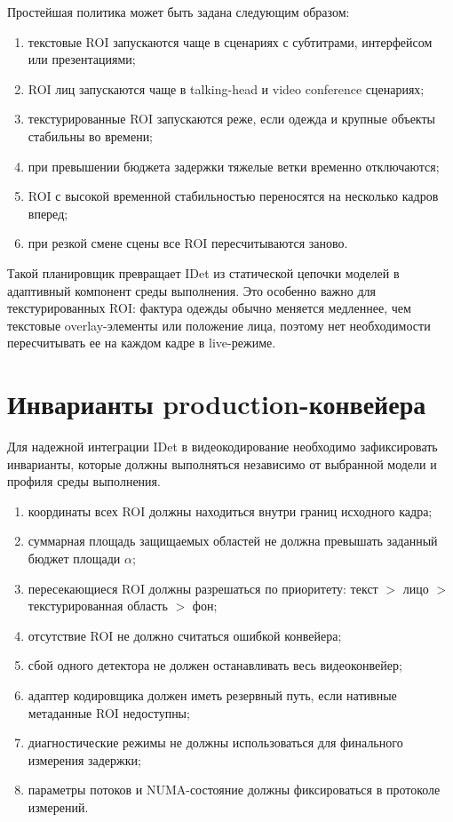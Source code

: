 \documentclass[12pt,a4paper,oneside,openany]{report}
\begin{document}
Простейшая политика может быть задана следующим образом:
\begin{enumerate}[label=\arabic*)]
\item текстовые ROI запускаются чаще в сценариях с субтитрами, интерфейсом или презентациями;
\item ROI лиц запускаются чаще в talking-head и video conference сценариях;
\item текстурированные ROI запускаются реже, если одежда и крупные объекты стабильны во времени;
\item при превышении бюджета задержки тяжелые ветки временно отключаются;
\item ROI с высокой временной стабильностью переносятся на несколько кадров вперед;
\item при резкой смене сцены все ROI пересчитываются заново.
\end{enumerate}

Такой планировщик превращает IDet из статической цепочки моделей в адаптивный компонент среды выполнения. Это особенно важно для текстурированных ROI: фактура одежды обычно меняется медленнее, чем текстовые overlay-элементы или положение лица, поэтому нет необходимости пересчитывать ее на каждом кадре в live-режиме.


\section{Инварианты production-конвейера}

Для надежной интеграции IDet в видеокодирование необходимо зафиксировать инварианты, которые должны выполняться независимо от выбранной модели и профиля среды выполнения.

\begin{enumerate}[label=\arabic*)]
\item координаты всех ROI должны находиться внутри границ исходного кадра;
\item суммарная площадь защищаемых областей не должна превышать заданный бюджет площади $\alpha$;
\item пересекающиеся ROI должны разрешаться по приоритету: текст $>$ лицо $>$ текстурированная область $>$ фон;
\item отсутствие ROI не должно считаться ошибкой конвейера;
\item сбой одного детектора не должен останавливать весь видеоконвейер;
\item адаптер кодировщика должен иметь резервный путь, если нативные метаданные ROI недоступны;
\item диагностические режимы не должны использоваться для финального измерения задержки;
\item параметры потоков и NUMA-состояние должны фиксироваться в протоколе измерений.
\end{enumerate}
\end{document}
